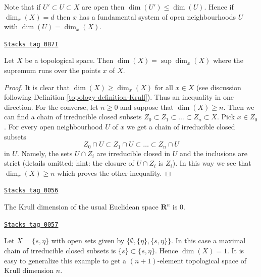 Note that if $U' \subset U \subset X$ are open then
$\dim(U') \leq \dim(U)$. Hence if $\dim_x(X) = d$ then $x$
has a fundamental system of open neighbourhoods $U$ with
$\dim(U) = \dim_x(X)$.

\begin{lemma}
\label{topology-lemma-dimension-supremum-local-dimensions}
\href{https://stacks.math.columbia.edu/tag/0B7I}{\texttt{Stacks tag 0B7I}}

Let $X$ be a topological space. Then $\dim(X) = \sup \dim_x(X)$
where the supremum runs over the points $x$ of $X$.
\end{lemma}

\begin{proof}

It is clear that $\dim(X) \geq \dim_x(X)$ for all $x \in X$ (see
discussion following Definition \ref{topology-definition-Krull}).
Thus an inequality in one direction. For the converse, let $n \geq 0$
and suppose that $\dim(X) \geq n$. Then we can find a chain of irreducible
closed subsets $Z_0 \subset Z_1 \subset \ldots \subset Z_n \subset X$.
Pick $x \in Z_0$. For every open neighbourhood $U$ of $x$ we get
a chain of irreducible closed subsets
$$
Z_0 \cap U \subset Z_1 \cap U \subset \ldots \subset Z_n \cap U
$$
in $U$. Namely, the sets $U \cap Z_i$ are irreducible closed in $U$ and the
inclusions are strict (details omitted; hint: the closure of $U \cap Z_i$
is $Z_i$).
In this way we see that $\dim_x(X) \geq n$ which proves the other
inequality.
\end{proof}

\begin{example}[Krull Rn]
\label{topology-example-Krull-Rn}
\href{https://stacks.math.columbia.edu/tag/0056}{\texttt{Stacks tag 0056}}

The Krull dimension of the usual Euclidean space
$\mathbf{R}^n$ is $0$.
\end{example}

\begin{example}
\label{topology-example-krull-2set}
\href{https://stacks.math.columbia.edu/tag/0057}{\texttt{Stacks tag 0057}}

Let $X = \{s, \eta\}$ with open sets given
by $\{\emptyset, \{\eta\}, \{s, \eta\}\}$.
In this case a maximal chain of irreducible
closed subsets is $\{s\} \subset \{s, \eta\}$.
Hence $\dim(X) = 1$. It is easy to generalize
this example to get a $(n + 1)$-element topological
space of Krull dimension $n$.
\end{example}


